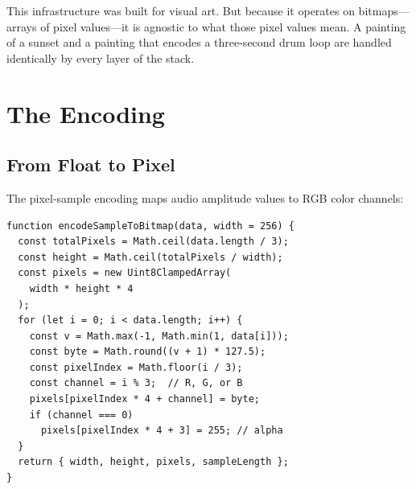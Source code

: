 \documentclass[10pt,letterpaper,twocolumn]{article}
\makeatletter
\newcommand{\codebreak}{\discretionary{}{}{}}
\newcommand{\codesoftbreak}{\penalty9999\relax}
\gdef\codeUS{_}\gdef\codeSL{/}\gdef\codeDT{.}%
\gdef\codeCL{:}\gdef\codeDS{-}\gdef\codeAT{@}%
\gdef\codeActivate{%
    \def_{\codeUS\codebreak}\def/{\codeSL\codebreak}\def.{\codeDT\codebreak}%
    \def:{\codeCL\codebreak}\def-{\codeDS\codebreak}\def@{\codeAT\codebreak}%
    \def\_{\codeUS\codebreak}}%
\newcommand{\code}[1]{%
  \begingroup
    \ttfamily
    \catcode`\_=\active \catcode`\/=\active \catcode`\.=\active
    \catcode`\:=\active \catcode`\-=\active \catcode`\@=\active
    \codeActivate
    \ifdefined\XeTeXinterchartokenstate
      \XeTeXinterchartokenstate=1
      \XeTeXinterchartoks 0 0 = {\codesoftbreak}%
    \fi
    \endlinechar=-1 \everyeof{}%
    \scantokens{#1}%
  \endgroup}
\makeatother
\begin{document}

This infrastructure was built for visual art. But because it operates on bitmaps---arrays of pixel values---it is agnostic to what those pixel values mean. A painting of a sunset and a painting that encodes a three-second drum loop are handled identically by every layer of the stack.

\section{The Encoding}

\subsection{From Float to Pixel}

The pixel-sample encoding maps audio amplitude values to RGB color channels:

\begin{lstlisting}[language=acjs]
function encodeSampleToBitmap(data, width = 256) {
  const totalPixels = Math.ceil(data.length / 3);
  const height = Math.ceil(totalPixels / width);
  const pixels = new Uint8ClampedArray(
    width * height * 4
  );
  for (let i = 0; i < data.length; i++) {
    const v = Math.max(-1, Math.min(1, data[i]));
    const byte = Math.round((v + 1) * 127.5);
    const pixelIndex = Math.floor(i / 3);
    const channel = i % 3;  // R, G, or B
    pixels[pixelIndex * 4 + channel] = byte;
    if (channel === 0)
      pixels[pixelIndex * 4 + 3] = 255; // alpha
  }
  return { width, height, pixels, sampleLength };
}
\end{lstlisting}
\end{document}
